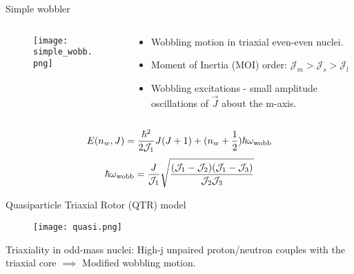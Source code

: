 \documentclass [11pt]{beamer}
\begin{document}
\begin{frame}{Simple wobbler}
\begin{columns}[c]
\begin{column}{0.4\textwidth}
\begin{figure}
\begin{center}
\texttt{[image: simple\_wobb.png]}
\end{center}
\end{figure}
\end{column}
\begin{column}{0.6\textwidth}
\begin{itemize}
\item{Wobbling motion in triaxial even-even nuclei.}
\item{Moment of Inertia (MOI) order: $\mathcal{J}_{m}>\mathcal{J}_{s}>\mathcal{J}_{l}$}
\item{Wobbling excitations - small amplitude oscillations of $\vec{J}$ about the m-axis.}
\end{itemize}
\end{column}
\end{columns}
\begin{align*}
E(n_{w},\mathnormal{J}) = \frac{\hbar^{2}}{2\mathcal{J}_{1}}J(J+1) + (n_{w} + \frac{1}{2})\hbar\omega\textsubscript{wobb}
\end{align*}
\begin{align*}
\space \space \space \space \hbar\omega\textsubscript{wobb} = \frac{J}{\mathcal{J}_{1}}\sqrt{\frac{(\mathcal{J}_{1}-\mathcal{J}_{2})(\mathcal{J}_{1}-\mathcal{J}_{3})}{\mathcal{J}_{2}\mathcal{J}_{3}}}
\end{align*}
\end{frame}

\begin{frame}{Quasiparticle Triaxial Rotor (QTR) model}
\begin{figure}
\begin{center}
\texttt{[image: quasi.png]}
\end{center}
\end{figure}
Triaxiality in odd-mass nuclei: High-j unpaired proton/neutron couples with the triaxial core $\implies$ Modified wobbling motion.
\end{frame}
\end{document}
